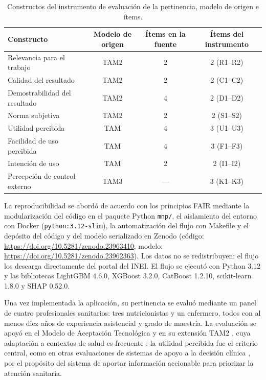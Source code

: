 \documentclass[final,5p,times,twocolumn,number,lefttitle]{elsarticle}
\begin{document}
\begin{table}[!t]
\centering
\caption{Constructos del instrumento de evaluación de la pertinencia, modelo de origen e ítems.}
\label{tab:constructos_tam}
\begin{tabular}{lccc}
\hline
Constructo & Modelo de origen & Ítems en la fuente & Ítems del instrumento \\
\hline
Relevancia para el trabajo & TAM2 & 2 & 2 (R1--R2) \\
Calidad del resultado & TAM2 & 2 & 2 (C1--C2) \\
Demostrabilidad del resultado & TAM2 & 4 & 2 (D1--D2) \\
Norma subjetiva & TAM2 & 2 & 2 (S1--S2) \\
Utilidad percibida & TAM & 4 & 3 (U1--U3) \\
Facilidad de uso percibida & TAM & 4 & 3 (F1--F3) \\
Intención de uso & TAM & 2 & 2 (I1--I2) \\
Percepción de control externo & TAM3 & --- & 3 (K1--K3) \\
\hline
\end{tabular}
\end{table}

La reproducibilidad se abordó de acuerdo con los principios FAIR mediante la modularización del código en el paquete Python \texttt{mnp/}, el aislamiento del entorno con Docker (\texttt{python:3.12-slim}), la automatización del flujo con Makefile y el depósito del código y del modelo serializado en Zenodo (código: \url{https://doi.org/10.5281/zenodo.23963410}; modelo: \url{https://doi.org/10.5281/zenodo.23962363}). Los datos no se redistribuyen: el flujo los descarga directamente del portal del INEI.
El flujo se ejecutó con Python 3.12 y las bibliotecas LightGBM 4.6.0, XGBoost 3.2.0, CatBoost 1.2.10, scikit-learn 1.8.0 y SHAP 0.52.0.

Una vez implementada la aplicación, su pertinencia se evaluó mediante un panel de cuatro profesionales sanitarios: tres nutricionistas y un enfermero, todos con al menos diez años de experiencia asistencial y grado de maestría. La evaluación se apoyó en el Modelo de Aceptación Tecnológica \citep{davis1989tam} y en su extensión TAM2 \citep{venkatesh2000tam2}, cuya adaptación a contextos de salud es frecuente \citep{matemba2020tamreview}; la utilidad percibida fue el criterio central, como en otras evaluaciones de sistemas de apoyo a la decisión clínica \citep{chien2025tam}, por el propósito del sistema de aportar información accionable para priorizar la atención sanitaria.
\end{document}
